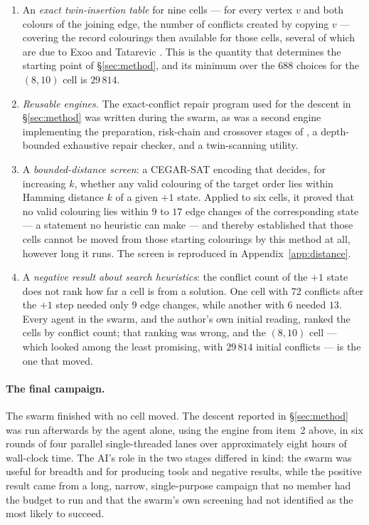 \documentclass[11pt]{article}
\begin{document}
\begin{enumerate}
\item An \emph{exact twin-insertion table} for nine cells --- for every vertex $v$ and both colours
      of the joining edge, the number of conflicts created by copying $v$ --- covering the record
      colourings then available for those cells, several of which are due to Exoo and Tatarevic
      \cite{exoo-tatarevic}. This is the quantity that
      determines the starting point of \S\ref{sec:method}, and its minimum over the $688$ choices for
      the $(8,10)$ cell is $29\,814$.
\item \emph{Reusable engines.} The exact-conflict repair program used for the descent in
      \S\ref{sec:method} was written during the swarm, as was a second engine implementing the
      preparation, risk-chain and crossover stages of \cite{cremer}, a depth-bounded exhaustive
      repair checker, and a twin-scanning utility.
\item A \emph{bounded-distance screen}: a CEGAR-SAT encoding that decides, for increasing $k$,
      whether any valid colouring of the target order lies within Hamming distance $k$ of a given
      $+1$ state. Applied to six cells, it proved that no valid colouring lies within $9$ to $17$
      edge changes of the corresponding state --- a statement no heuristic can make --- and thereby
      established that those cells cannot be moved from those starting colourings by this method at
      all, however long it runs. The screen is reproduced in Appendix~\ref{app:distance}.
\item A \emph{negative result about search heuristics}: the conflict count of the $+1$ state does not
      rank how far a cell is from a solution. One cell with $72$ conflicts after the $+1$ step needed
      only $9$ edge changes, while another with $6$ needed $13$. Every agent in the swarm, and the
      author's own initial reading, ranked the cells by conflict count; that ranking was wrong, and
      the $(8,10)$ cell --- which looked among the least promising, with $29\,814$ initial
      conflicts --- is the one that moved.
\end{enumerate}

\paragraph{The final campaign.}
The swarm finished with no cell moved. The descent reported in \S\ref{sec:method} was run afterwards
by the agent alone, using the engine from item~2 above, in six rounds of four parallel single-threaded
lanes over approximately eight hours of wall-clock time. The AI's role in the two stages differed in
kind: the swarm was useful for breadth and for producing tools and negative results, while the
positive result came from a long, narrow, single-purpose campaign that no member had the budget to
run and that the swarm's own screening had not identified as the most likely to succeed.
\end{document}
